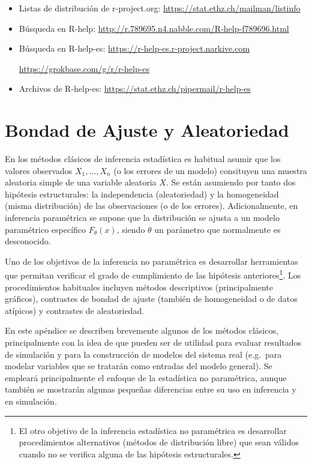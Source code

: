 \documentclass[
]{book}
\theoremstyle{break}
\theoremstyle{definition}
\theoremstyle{definition}
\theoremstyle{definition}
\theoremstyle{remark}
\begin{document}
\begin{itemize}
  \begin{itemize}
  \item
    Listas de distribución de r-project.org: \url{https://stat.ethz.ch/mailman/listinfo}
  \item
    Búsqueda en R-help: \url{http://r.789695.n4.nabble.com/R-help-f789696.html}
  \item
    Búsqueda en R-help-es: \url{https://r-help-es.r-project.narkive.com}

    \url{https://grokbase.com/g/r/r-help-es}
  \item
    Archivos de R-help-es: \url{https://stat.ethz.ch/pipermail/r-help-es}
  \end{itemize}
\end{itemize}

\hypertarget{gof-aleat}{%
\chapter{Bondad de Ajuste y Aleatoriedad}\label{gof-aleat}}

En los métodos clásicos de inferencia estadística es habitual asumir que los valores observados \(X_1,\ldots, X_n\) (o los errores de un modelo) consituyen una muestra aleatoria simple de una variable aleatoria \(X\).
Se están asumiendo por tanto dos hipótesis estructurales: la independencia (aleatoriedad) y la homogeneidad (misma distribución) de las observaciones (o de los errores).
Adicionalmente, en inferencia paramétrica se supone que la distribución se ajusta a un modelo
paramétrico específico \(F_{\theta}(x)\), siendo \(\theta\) un parámetro que normalmente es desconocido.

Uno de los objetivos de la inferencia no paramétrica es desarrollar herramientas que permitan verificar el grado de cumplimiento de las hipótesis anteriores\footnote{El otro objetivo de la inferencia estadística no paramétrica es desarrollar procedimientos alternativos (métodos de distribución libre) que sean válidos cuando no se verifica alguna de las hipótesis estructurales.}.
Los procedimientos habituales incluyen métodos descriptivos (principalmente gráficos), contrastes de bondad de ajuste (también de homogeneidad o de datos atípicos) y contrastes de aleatoriedad.

En este apéndice se describen brevemente algunos de los métodos clásicos, principalmente con la idea de que pueden ser de utilidad para evaluar resultados de simulación y para la construcción de modelos del sistema real (e.g.~para modelar variables que se tratarán como entradas del modelo general). Se empleará principalmente el enfoque de la estadística no paramétrica, aunque también se mostrarán algunas pequeñas diferencias entre su uso en inferencia y en simulación.
\end{document}
